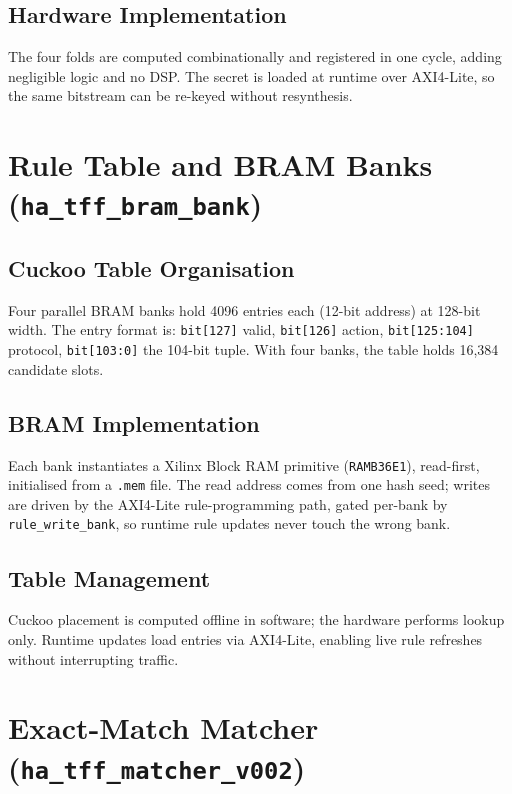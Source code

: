 \documentclass[12pt,twoside,openright]{book}
\begin{document}
\subsection{Hardware Implementation}

The four folds are computed combinationally and registered in one cycle, adding negligible logic and
no DSP. The secret is loaded at runtime over AXI4-Lite, so the same bitstream can be re-keyed
without resynthesis.

\section{Rule Table and BRAM Banks (\texttt{ha\_tff\_bram\_bank})}

\subsection{Cuckoo Table Organisation}

Four parallel BRAM banks hold 4096 entries each (12-bit address) at 128-bit width. The entry format
is: \texttt{bit[127]} valid, \texttt{bit[126]} action, \texttt{bit[125:104]} protocol,
\texttt{bit[103:0]} the 104-bit tuple. With four banks, the table holds 16{,}384 candidate slots.

\subsection{BRAM Implementation}

Each bank instantiates a Xilinx Block RAM primitive (\texttt{RAMB36E1}), read-first, initialised
from a \texttt{.mem} file. The read address comes from one hash seed; writes are driven by the
AXI4-Lite rule-programming path, gated per-bank by \texttt{rule\_write\_bank}, so runtime rule
updates never touch the wrong bank.

\subsection{Table Management}

Cuckoo placement is computed offline in software; the hardware performs lookup only. Runtime
updates load entries via AXI4-Lite, enabling live rule refreshes without interrupting traffic.

\section{Exact-Match Matcher (\texttt{ha\_tff\_matcher\_v002})}
\end{document}
